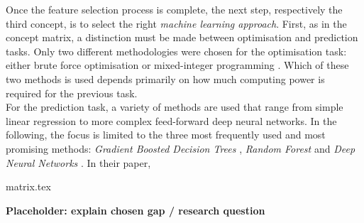 Once the feature selection process is complete, the next step, respectively the third concept, is to select the right \emph{machine learning approach}. First, as in the concept matrix, a distinction must be made between optimisation and prediction tasks. Only two different methodologies were chosen for the optimisation task: either brute force optimisation \parencite{landers_machine_2017} or mixed-integer programming \parencite{becker_analytical_2016,edwards_analyzing_2018, belien_optimization_2017,bonomo_mathematical_2014,matthews_competing_2012}. Which of these two methods is used depends primarily on how much computing power is required for the previous task. \\
\indent For the prediction task, a variety of methods are used that range from simple linear regression to more complex feed-forward deep neural networks. In the following, the focus is limited to the three most frequently used and most promising methods:  \emph{Gradient Boosted Decision Trees} \parencite{landers_machine_2017,deng_analysis_2020}, \emph{Random Forest} \parencite{deng_analysis_2020,shah_poisson_2021,demediuk_performance_2021,bhateja_analysis_2021} and \emph{Deep Neural Networks} \parencite{bhateja_analysis_2021,skinner_method_2015,deng_analysis_2020,lutz_fantasy_2015,landers_machine_2017}. In their paper, \citet{deng_analysis_2020} 


{matrix.tex}


\textbf{Placeholder: explain chosen gap / research question }



